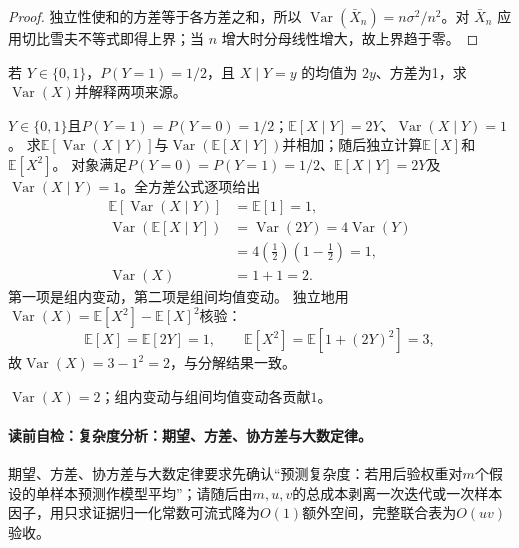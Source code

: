\begin{proof}
独立性使和的方差等于各方差之和，所以 $\operatorname{Var}(\bar X_n)=n\sigma^2/n^2$。对 $\bar X_n$ 应用切比雪夫不等式即得上界；当 $n$ 增大时分母线性增大，故上界趋于零。
\end{proof}
\begin{example}[方差分解]\label{exm:V1-C04-total-variance}
若 $Y\in\{0,1\}$，$P(Y=1)=1/2$，且 $X\mid Y=y$ 的均值为 $2y$、方差为1，求$\operatorname{Var}(X)$并解释两项来源。
\end{example}
\begin{solution}
\SolGiven $Y\in\{0,1\}$且$P(Y=1)=P(Y=0)=1/2$；$\mathbb E[X\mid Y]=2Y$、$\operatorname{Var}(X\mid Y)=1$。
\SolPlan 求$\mathbb E[\operatorname{Var}(X\mid Y)]$与$\operatorname{Var}(\mathbb E[X\mid Y])$并相加；随后独立计算$\mathbb E[X]$和$\mathbb E[X^2]$。
\SolDerive
对象满足$P(Y=0)=P(Y=1)=1/2$、$\mathbb E[X\mid Y]=2Y$及$\operatorname{Var}(X\mid Y)=1$。全方差公式逐项给出
\[
\begin{aligned}
\mathbb E[\operatorname{Var}(X\mid Y)]&=\mathbb E[1]=1,\\
\operatorname{Var}(\mathbb E[X\mid Y])
&=\operatorname{Var}(2Y)=4\operatorname{Var}(Y)\\
&=4\left(\frac12\right)\left(1-\frac12\right)=1,\\
\operatorname{Var}(X)&=1+1=2.
\end{aligned}
\]
第一项是组内变动，第二项是组间均值变动。
\SolCheck 独立地用$\operatorname{Var}(X)=\mathbb E[X^2]-\mathbb E[X]^2$核验：
\[
\mathbb E[X]=\mathbb E[2Y]=1,
\qquad
\mathbb E[X^2]=\mathbb E[1+(2Y)^2]=3,
\]
故$\operatorname{Var}(X)=3-1^2=2$，与分解结果一致。

\SolAnswer $\operatorname{Var}(X)=2$；组内变动与组间均值变动各贡献$1$。
\end{solution}


\label{struct:V1-C04-CH28}
\label{struct:V1-C04-CH29}
\paragraph{读前自检：复杂度分析：期望、方差、协方差与大数定律。}期望、方差、协方差与大数定律要求先确认“预测复杂度：若用后验权重对$m$个假设的单样本预测作模型平均”；请随后由$m,u,v$的总成本剥离一次迭代或一次样本因子，用只求证据归一化常数可流式降为$O(1)$额外空间，完整联合表为$O(uv)$验收。\par

